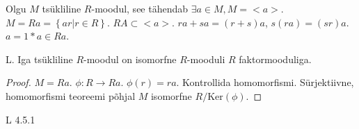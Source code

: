 \documentclass[12pt]{article}
\begin{document}
Olgu $M$ ts\"ukliline $R$-moodul, see tähendab $\exists a \in M, M = < a >$. $M = Ra = \left\{ ar | r \in R \right\}$. $RA \subset < a > $. $ra + sa = (r + s) a$, $s(ra) = (sr)a$. $a = 1 * a \in Ra$. 

L. Iga ts\"ukliline $R$-moodul on isomorfne $R$-mooduli $R$ faktormooduliga. 

\begin{proof}
$M = Ra$.
$\phi: R \to Ra$.
$\phi(r) = ra$.
Kontrollida homomorfismi. S\"urjektiivne, homomorfismi teoreemi põhjal $M$ isomorfne $R/ \text{Ker} \left( \phi \right)$.

\end{proof}



L 4.5.1
\end{document}
